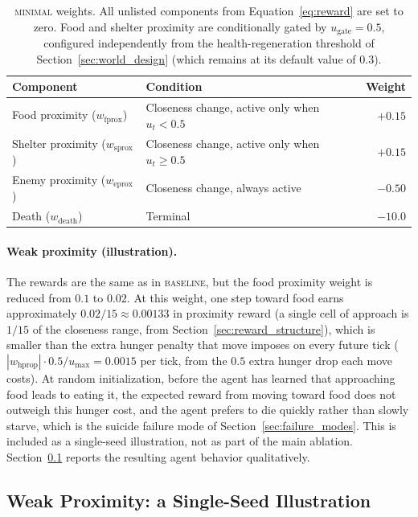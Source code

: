\documentclass[12pt,a4paper,titlepage]{article}
\begin{document}
\begin{table}[!ht]
\centering
\caption{\textsc{minimal} weights. All unlisted components from Equation~\ref{eq:reward} are set to zero. Food and shelter proximity are conditionally gated by $u_\text{gate} = 0.5$, configured independently from the health-regeneration threshold of Section~\ref{sec:world_design} (which remains at its default value of $0.3$).}
\label{tab:minimal_config}
\small
\begin{tabular}{llr}
\toprule
Component & Condition & Weight \\
\midrule
Food proximity ($w_\text{fprox}$)    & Closeness change, active only when $u_t < 0.5$    & $+0.15$ \\
Shelter proximity ($w_\text{sprox}$) & Closeness change, active only when $u_t \geq 0.5$ & $+0.15$ \\
Enemy proximity ($w_\text{eprox}$)   & Closeness change, always active                   & $-0.50$ \\
Death ($w_\text{death}$)             & Terminal                                          & $-10.0$ \\
\bottomrule
\end{tabular}
\end{table}

\paragraph{Weak proximity (illustration).} The rewards are the same as in \textsc{baseline}, but the food proximity weight is reduced from $0.1$ to $0.02$. At this weight, one step toward food earns approximately $0.02 / 15 \approx 0.00133$ in proximity reward (a single cell of approach is $1/15$ of the closeness range, from Section~\ref{sec:reward_structure}), which is smaller than the extra hunger penalty that move imposes on every future tick ($|w_\text{hprop}| \cdot 0.5 / u_\text{max} = 0.0015$ per tick, from the $0.5$ extra hunger drop each move costs). At random initialization, before the agent has learned that approaching food leads to eating it, the expected reward from moving toward food does not outweigh this hunger cost, and the agent prefers to die quickly rather than slowly starve, which is the suicide failure mode of Section~\ref{sec:failure_modes}. This is included as a single-seed illustration, not as part of the main ablation. Section~\ref{sec:weak_prox} reports the resulting agent behavior qualitatively.

\subsection{Weak Proximity: a Single-Seed Illustration}
\label{sec:weak_prox}
\end{document}
